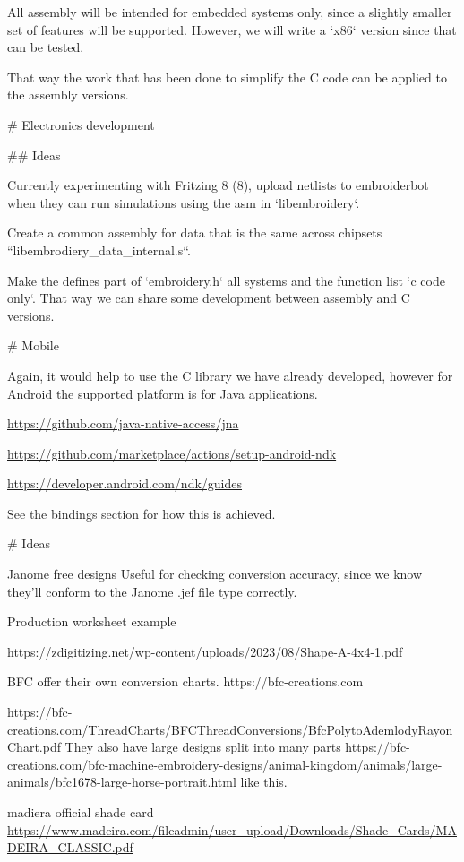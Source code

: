 All assembly will be intended for embedded systems only, since a slightly
smaller set of features will be supported. However, we will write a
`x86` version since that can be tested.

That way the work that has been done to simplify the C code can be applied
to the assembly versions.

# Electronics development

## Ideas

Currently experimenting with Fritzing 8 (8), upload netlists to embroiderbot when
they can run simulations using the asm in `libembroidery`.

Create a common assembly for data that is the same across chipsets
``libembrodiery\_data\_internal.s``.

Make the defines part of `embroidery.h` all systems and the function list
`c code only`. That way we can share some development between assembly and C versions.

# Mobile

Again, it would help to use the C library we have already developed,
however for Android the supported platform is for Java applications.

\url{https://github.com/java-native-access/jna}

\url{https://github.com/marketplace/actions/setup-android-ndk}

\url{https://developer.android.com/ndk/guides}

See the bindings section for how this is achieved.

# Ideas

Janome free designs %
Useful for checking conversion accuracy, since we know they'll conform to the
Janome .jef file type correctly.

Production worksheet example

https://zdigitizing.net/wp-content/uploads/2023/08/Shape-A-4x4-1.pdf

BFC offer their own conversion charts.
https://bfc-creations.com

https://bfc-creations.com/ThreadCharts/BFCThreadConversions/BfcPolytoAdemlodyRayonChart.pdf
They also have large designs split into many parts
https://bfc-creations.com/bfc-machine-embroidery-designs/animal-kingdom/animals/large-animals/bfc1678-large-horse-portrait.html
like this.

madiera official shade card
\url{https://www.madeira.com/fileadmin/user_upload/Downloads/Shade_Cards/MADEIRA_CLASSIC.pdf}

